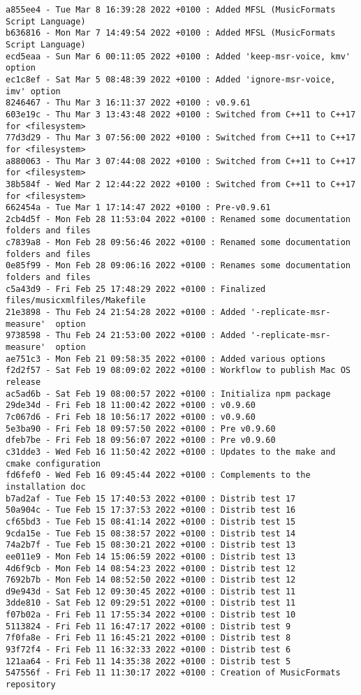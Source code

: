 \begin{lstlisting}[language=Terminal]
a855ee4 - Tue Mar 8 16:39:28 2022 +0100 : Added MFSL (MusicFormats Script Language)
b636816 - Mon Mar 7 14:49:54 2022 +0100 : Added MFSL (MusicFormats Script Language)
ecd5eaa - Sun Mar 6 00:11:05 2022 +0100 : Added 'keep-msr-voice, kmv' option
ec1c8ef - Sat Mar 5 08:48:39 2022 +0100 : Added 'ignore-msr-voice, imv' option
8246467 - Thu Mar 3 16:11:37 2022 +0100 : v0.9.61
603e19c - Thu Mar 3 13:43:48 2022 +0100 : Switched from C++11 to C++17 for <filesystem>
77d3d29 - Thu Mar 3 07:56:00 2022 +0100 : Switched from C++11 to C++17 for <filesystem>
a880063 - Thu Mar 3 07:44:08 2022 +0100 : Switched from C++11 to C++17 for <filesystem>
38b584f - Wed Mar 2 12:44:22 2022 +0100 : Switched from C++11 to C++17 for <filesystem>
662454a - Tue Mar 1 17:14:47 2022 +0100 : Pre-v0.9.61
2cb4d5f - Mon Feb 28 11:53:04 2022 +0100 : Renamed some documentation folders and files
c7839a8 - Mon Feb 28 09:56:46 2022 +0100 : Renamed some documentation folders and files
0e85f99 - Mon Feb 28 09:06:16 2022 +0100 : Renames some documentation folders and files
c5a43d9 - Fri Feb 25 17:48:29 2022 +0100 : Finalized files/musicxmlfiles/Makefile
21e3898 - Thu Feb 24 21:54:28 2022 +0100 : Added '-replicate-msr-measure'  option
9738598 - Thu Feb 24 21:53:00 2022 +0100 : Added '-replicate-msr-measure'  option
ae751c3 - Mon Feb 21 09:58:35 2022 +0100 : Added various options
f2d2f57 - Sat Feb 19 08:09:02 2022 +0100 : Workflow to publish Mac OS release
ac5ad6b - Sat Feb 19 08:00:57 2022 +0100 : Initializa npm package
29de34d - Fri Feb 18 11:00:42 2022 +0100 : v0.9.60
7c067d6 - Fri Feb 18 10:56:17 2022 +0100 : v0.9.60
5e3ba90 - Fri Feb 18 09:57:50 2022 +0100 : Pre v0.9.60
dfeb7be - Fri Feb 18 09:56:07 2022 +0100 : Pre v0.9.60
c31dde3 - Wed Feb 16 11:50:42 2022 +0100 : Updates to the make and cmake configuration
fd6fef0 - Wed Feb 16 09:45:44 2022 +0100 : Complements to the installation doc
b7ad2af - Tue Feb 15 17:40:53 2022 +0100 : Distrib test 17
50a904c - Tue Feb 15 17:37:53 2022 +0100 : Distrib test 16
cf65bd3 - Tue Feb 15 08:41:14 2022 +0100 : Distrib test 15
9cda15e - Tue Feb 15 08:38:57 2022 +0100 : Distrib test 14
74a2b7f - Tue Feb 15 08:30:21 2022 +0100 : Distrib test 13
ee011e9 - Mon Feb 14 15:06:59 2022 +0100 : Distrib test 13
4d6f9cb - Mon Feb 14 08:54:23 2022 +0100 : Distrib test 12
7692b7b - Mon Feb 14 08:52:50 2022 +0100 : Distrib test 12
d9e943d - Sat Feb 12 09:30:45 2022 +0100 : Distrib test 11
3dde810 - Sat Feb 12 09:29:51 2022 +0100 : Distrib test 11
f07b02a - Fri Feb 11 17:55:34 2022 +0100 : Distrib test 10
5113824 - Fri Feb 11 16:47:17 2022 +0100 : Distrib test 9
7f0fa8e - Fri Feb 11 16:45:21 2022 +0100 : Distrib test 8
93f72f4 - Fri Feb 11 16:32:33 2022 +0100 : Distrib test 6
121aa64 - Fri Feb 11 14:35:38 2022 +0100 : Distrib test 5
547556f - Fri Feb 11 11:30:17 2022 +0100 : Creation of MusicFormats repository
\end{lstlisting}

